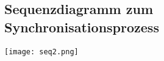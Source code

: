 \subsection{Sequenzdiagramm zum Synchronisationsprozess}
\label{app:sequenz}
\begin{center}
\texttt{[image: seq2.png]}
\end{center}